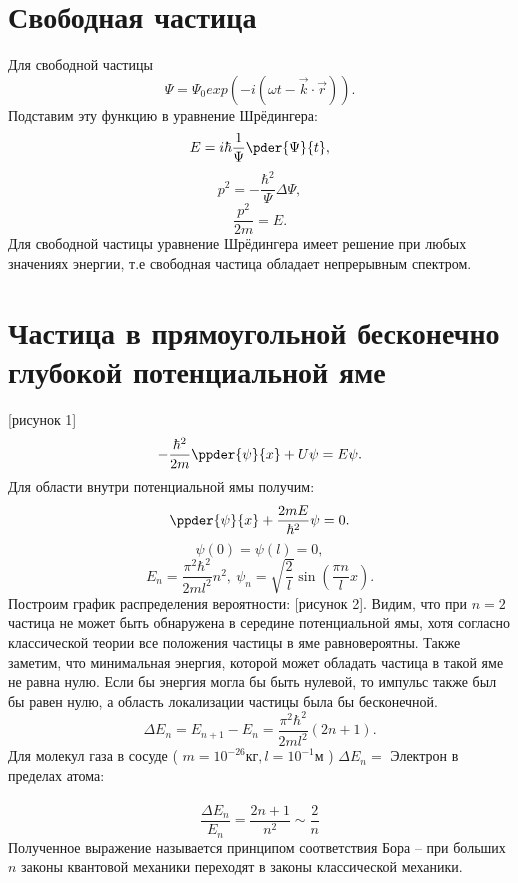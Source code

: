 \section{Свободная частица}
Для свободной частицы
\[
    \Psi = \Psi_0 exp(-i(\omega t - \vec{k}\cdot\vec{r})).
\]
Подставим эту функцию в уравнение Шрёдингера:
\begin{equation}
     E = i\hbar\frac{1}{\Psi}\pder{\Psi}{t},
\end{equation} 
\begin{equation}
     p^2 = -\frac{\hbar^2}{\Psi}\Delta\Psi,
\end{equation}
\begin{equation}
     \frac{p^2}{2m} = E.
\end{equation}
Для свободной частицы уравнение Шрёдингера имеет решение при любых значениях
энергии, т.е свободная частица обладает непрерывным спектром.

\section{Частица в прямоугольной бесконечно глубокой потенциальной яме}
[рисунок 1]
\begin{equation}
    -\frac{\hbar^2}{2m}\ppder{\psi}{x} + U\psi = E\psi.
\end{equation}
Для области внутри потенциальной ямы получим:
\begin{equation}
    \ppder{\psi}{x} + \frac{2mE}{\hbar^2}\psi = 0.
\end{equation}
\[ \psi(0) = \psi(l) = 0, \]
\begin{equation}
    E_n = \frac{\pi^2\hbar^2}{2ml^2}n^2,\ 
    \psi_n = \sqrt{\frac{2}{l}}\sin(\frac{\pi n}{l}x).
\end{equation}
Построим график распределения вероятности: [рисунок 2]. Видим, что при \(n=2\)
частица не может быть обнаружена в середине потенциальной ямы, хотя согласно
классической теории все положения частицы в яме равновероятны. Также заметим,
что минимальная энергия, которой может обладать частица в такой яме не равна
нулю. Если бы энергия могла бы быть нулевой, то импульс также был бы равен нулю,
а область локализации частицы была бы бесконечной.
\[
    \Delta E_n = E_{n+1} - E_n = \frac{\pi^2\hbar^2}{2ml^2}(2n+1).
\]
Для молекул газа в сосуде ( \( m = 10^{-26}\text{кг}, l = 10^{-1}\text{м} \) )
\( \Delta E_n =  \)
Электрон в пределах атома: \\ \\
\[
    \frac{\Delta E_n}{E_n} = \frac{2n+1}{n^2} \sim \frac{2}{n}
\]
Полученное выражение называется принципом соответствия Бора -- при больших
\( n \) законы квантовой механики переходят в законы классической механики.



